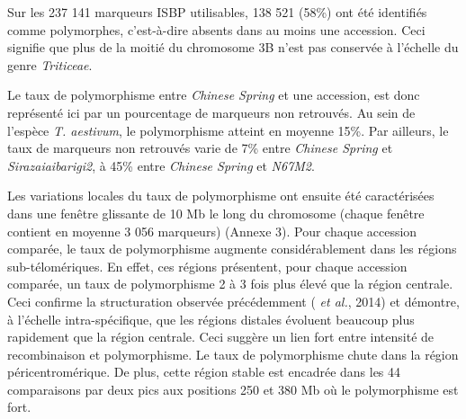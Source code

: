 \documentclass[a4paper, 12pt]{article}
\begin{document}
\begin{onehalfspace}
Sur les 237 141 marqueurs ISBP utilisables, 138 521 (58\%) ont été identifiés comme polymorphes, c'est-à-dire absents dans au moins une accession. Ceci signifie que plus de la moitié du chromosome 3B n'est pas conservée à l'échelle du genre \textit{Triticeae}. 

Le taux de polymorphisme entre \textit{Chinese Spring} et une accession, est donc représenté ici par un pourcentage de marqueurs non retrouvés. Au sein de l'espèce \textit{T. aestivum}, le polymorphisme atteint en moyenne 15\%. Par ailleurs, le taux de marqueurs non retrouvés varie de 7\% entre \textit{Chinese Spring} et \textit{Sirazaiaibarigi2}, à 45\% entre \textit{Chinese Spring} et \textit{N67M2}.

Les variations locales du taux de polymorphisme ont ensuite été caractérisées dans une fenêtre glissante de 10 Mb le long du chromosome (chaque fenêtre contient en moyenne 3 056 marqueurs) (Annexe 3). Pour chaque accession comparée, le taux de polymorphisme augmente considérablement dans les régions sub-télomériques. En effet, ces régions présentent, pour chaque accession comparée, un taux de polymorphisme 2 à 3 fois plus élevé que la région centrale. Ceci confirme la structuration observée précédemment ( \textit{et al.}, 2014) et démontre, à l'échelle intra-spécifique, que les régions distales évoluent beaucoup plus rapidement que la région centrale. Ceci suggère un lien fort entre intensité de recombinaison et polymorphisme. Le taux de polymorphisme chute dans la région péricentromérique. De plus, cette région stable est encadrée dans les 44 comparaisons par deux pics aux positions 250 et 380 Mb où le polymorphisme est fort.


\end{onehalfspace}
\end{document}
